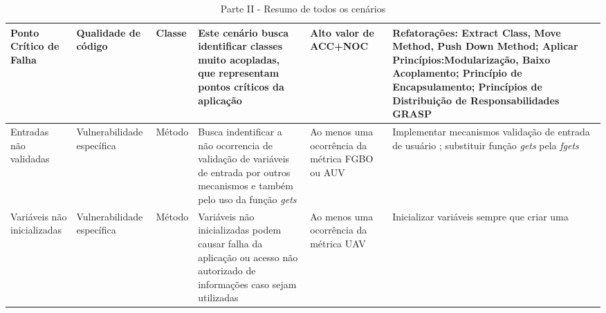 \begin{landscape}
\begin{table}[H]
\begin{center}
\begin{tabular}{ |p{}| p{3cm} | p{2cm} | p{5cm} | p{5cm}  | p{5cm}  |}
	    Ponto Crítico de Falha & Qualidade de código & Classe & Este cenário busca identificar classes muito acopladas, que representam pontos críticos da aplicação & Alto valor de ACC+NOC & \textbf{Refatorações}: Extract Class, Move Method, Push Down Method; \textbf{Aplicar Princípios}:Modularização, Baixo Acoplamento; Princípio de Encapsulamento; Princípios de Distribuição de Responsabilidades GRASP \\
	 \hline
	    Entradas não validadas  & Vulnerabilidade específica & Método & Busca indentificar a não ocorrencia de validação de variáveis de entrada por outros mecanismos e também pelo uso da função \emph{gets} & Ao menos uma ocorrência da métrica FGBO ou AUV & Implementar mecanismos validação de entrada de usuário ; substituir função \emph{gets} pela \emph{fgets} \\ \hline
	    Variáveis não inicializadas  & Vulnerabilidade específica & Método & Variáveis não inicializadas podem causar falha da aplicação ou acesso não autorizado de informações caso sejam utilizadas & Ao menos uma ocorrência da métrica UAV & Inicializar variáveis sempre que criar uma\\ \hline

	    \end{tabular}
		    \caption{Parte II - Resumo de todos os cenários}
		    \label{tab:resumo2}
		\end{center}
	\end{table}


\end{landscape}

